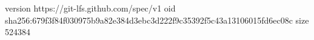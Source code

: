 version https://git-lfs.github.com/spec/v1
oid sha256:679f3f84f030975b9a82e384d3ebc3d222f9c35392f5c43a13106015fd6ec08c
size 524384
